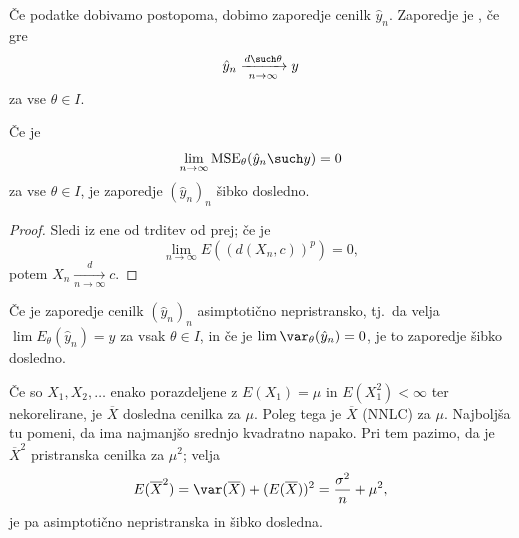 
Če podatke dobivamo postopoma, dobimo zaporedje cenilk $\hat{y}_n$.
Zaporedje je , če gre
\[
  \hat{y}_n \xrightarrow[n \to \infty]{d \such \theta} y
\]
za vse $\theta \in I$.

\begin{trditev}
  Če je
  \[
	\lim_{n \to \infty} \operatorname{MSE}_\theta(\hat{y}_n \such y) = 0
  \]
  za vse $\theta \in I$, je zaporedje $(\hat{y}_n)_n$ šibko dosledno.
\end{trditev}

\begin{proof}
  Sledi iz ene od trditev od prej; če je
  \[
	\lim_{n \to \infty} E((d(X_n, c))^p) = 0,
  \]
  potem $X_n \xrightarrow[n \to \infty]{d} c$.
\end{proof}


\begin{posledica}
  Če je zaporedje cenilk $(\hat{y}_n)_n$ asimptotično nepristransko, tj.~da
  velja $\lim E_\theta(\hat{y}_n) = y$ za vsak $\theta \in I$, in če je $\lim
  \var_\theta(\hat{y}_n) = 0$, je to zaporedje šibko dosledno.
\end{posledica}

Če so $X_1, X_2, \ldots$ enako porazdeljene z $E(X_1) = \mu$ in $E(X_1^2) <
\infty$ ter nekorelirane, je $\overline{X}$ dosledna cenilka za $\mu$.
Poleg tega je $\overline{X}$ 
(NNLC) za $\mu$.
Najboljša tu pomeni, da ima najmanjšo srednjo kvadratno napako.
Pri tem pazimo, da je $\overline{X}^2$ pristranska cenilka za $\mu^2$; velja
\[
  E(\overline{X}^2) = \var(\overline{X}) + (E(\overline{X}))^2
  = \frac{\sigma^2}{n} + \mu^2,
\]
je pa asimptotično nepristranska in šibko dosledna.

